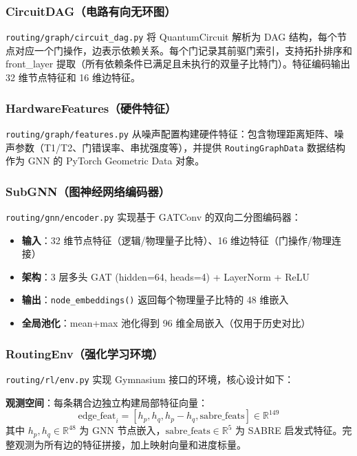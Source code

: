 \subsubsection{CircuitDAG（电路有向无环图）}

\texttt{routing/graph/circuit\_dag.py} 将 QuantumCircuit 解析为 DAG 结构，每个节点对应一个门操作，边表示依赖关系。每个门记录其前驱门索引，支持拓扑排序和 front\_layer 提取（所有依赖条件已满足且未执行的双量子比特门）。特征编码输出 32 维节点特征和 16 维边特征。

\subsubsection{HardwareFeatures（硬件特征）}

\texttt{routing/graph/features.py} 从噪声配置构建硬件特征：包含物理距离矩阵、噪声参数（T1/T2、门错误率、串扰强度等），并提供 \texttt{RoutingGraphData} 数据结构作为 GNN 的 PyTorch Geometric Data 对象。

\subsubsection{SubGNN（图神经网络编码器）}

\texttt{routing/gnn/encoder.py} 实现基于 GATConv 的双向二分图编码器：
\begin{itemize}
  \item \textbf{输入}：32 维节点特征（逻辑/物理量子比特）、16 维边特征（门操作/物理连接）
  \item \textbf{架构}：3 层多头 GAT (hidden=64, heads=4) + LayerNorm + ReLU
  \item \textbf{输出}：\texttt{node\_embeddings()} 返回每个物理量子比特的 48 维嵌入
  \item \textbf{全局池化}：mean+max 池化得到 96 维全局嵌入（仅用于历史对比）
\end{itemize}

\subsubsection{RoutingEnv（强化学习环境）}

\texttt{routing/rl/env.py} 实现 Gymnasium 接口的环境，核心设计如下：

\textbf{观测空间}：每条耦合边独立构建局部特征向量：
\[
\text{edge\_feat}_i = [h_p, h_q, h_p-h_q, \text{sabre\_feats}] \in \mathbb{R}^{149}
\]
其中 $h_p, h_q \in \mathbb{R}^{48}$ 为 GNN 节点嵌入，$\text{sabre\_feats} \in \mathbb{R}^5$ 为 SABRE 启发式特征。完整观测为所有边的特征拼接，加上映射向量和进度标量。

